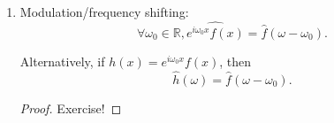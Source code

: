 \documentclass[12pt]{report}
\theoremstyle{definition}
\begin{document}
\begin{enumerate}[label = (\roman*)]
        Alternatively, if $h(x) = f(x-x_0)$, then\[
            \hat{h}(\omega) = e^{-i\omega x_0}\hat{f}(\omega).
        \]
        \begin{proof}
            \begin{align*}
                \hat{f}(\omega)
                & = \int_{-\infty}^{\infty} f(x)e^{-i\omega x}\mathrm{d}x \\
                & = \int_{-\infty}^{\infty} f(x-x_0)e^{i\omega(x_0-x)}\mathrm{d}(x-x_0) \\
            \end{align*} 
            By multiplying $e^{-i\omega x_0}$, we obtain\[
                e^{-i\omega x_0}\hat{f}(\omega) = \int_{-\infty}^{\infty} f(x-x_0)e^{i\omega x}\mathrm{d}x.
            \]Alternative approach:
            \begin{align*}
                f(x-x_0)
                & = \frac{1}{2\pi}\int_{-\infty}^{\infty} \hat{f}(\omega)e^{i\omega (x-x_0)}\mathrm{d}\omega \\
                & = \frac{1}{2\pi}\int_{-\infty}^{\infty} e^{-i\omega x_0}\hat{f}(\omega)e^{i\omega x}\mathrm{d}\omega \\
                & = h(x) = \frac{1}{2\pi}\int_{-\infty}^{\infty} \hat{h}(\omega)e^{i\omega x}\mathrm{d}\omega
            \end{align*} 
            The most direct approach:
            \begin{align*}
                \widehat{f(x-x_0)}
                & = \int_{-\infty}^{\infty} f(x-x_0)e^{-i\omega x}\mathrm{d}x \\
                & = \int_{-\infty}^{\infty} f(y)e^{-i\omega(y+x_0)}
                \mathrm{d}(y+x_0) \\
                & = (e^{-i\omega x_0})\int_{-\infty}^{\infty} 
                f(y)e^{-i\omega y}\mathrm{d}y \\
                & = e^{-i\omega x_0} \hat{f}(x).
            \end{align*} 
        \end{proof} 

    \item Modulation/frequency shifting:
        \[
            \forall \omega_0\in\mathbb{R}, \widehat{e^{i\omega_0x}f(x)} = \hat{f}(\omega - \omega_0).
        \]

        Alternatively, if $h(x) = e^{i\omega_0x}f(x)$, then\[
            \hat{h}(\omega) = \hat{f}(\omega - \omega_0).
        \]

        \begin{proof}
            Exercise!
        \end{proof} 


\end{enumerate}
\end{document}
